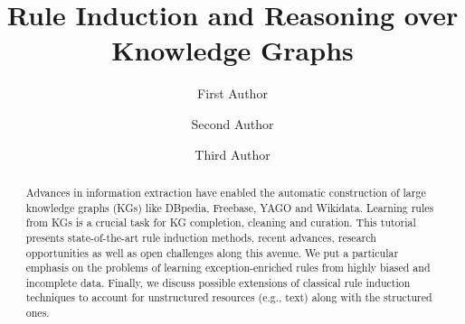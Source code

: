 \documentclass[runningheads]{llncs}
\begin{document}
%
\title{Rule Induction and Reasoning over\\ Knowledge Graphs}
%
%
\author{First Author \and
Second Author \and
Third Author}


%
%
%
\maketitle              %
%
\begin{abstract}
Advances in information extraction have enabled the automatic
construction of large knowledge graphs (KGs) like DBpedia, Freebase, YAGO
and Wikidata. Learning rules from KGs is a crucial task for KG completion,
cleaning and curation. This tutorial presents state-of-the-art rule
induction methods, recent advances, research opportunities as well as open
challenges along this avenue. We put a particular emphasis on the problems
of learning exception-enriched rules from highly biased and incomplete
data. Finally, we discuss possible extensions of classical rule induction
techniques to account for unstructured resources (e.g., text) along with
the structured ones.
\end{abstract}









%


%
%
 
 
%
\end{document}
